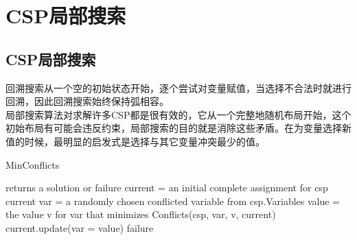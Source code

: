 \newpage

\section{CSP局部搜索}

\subsection{CSP局部搜索}

回溯搜索从一个空的初始状态开始，逐个尝试对变量赋值，当选择不合法时就进行回溯，因此回溯搜索始终保持弧相容。\\

局部搜索算法对求解许多CSP都是很有效的，它从一个完整地随机布局开始，这个初始布局有可能会违反约束，局部搜索的目的就是消除这些矛盾。在为变量选择新值的时候，最明显的启发式是选择与其它变量冲突最少的值。\\

\begin{algorithm}[H]
    \caption{MinConflicts}
    \begin{algorithmic}[1]
         returns a solution or failure
        \State current = an initial complete assignment for csp
        \State \Return current
        \EndIf
        \State var = a randomly chosen conflicted variable from csp.Variables
        \State value = the value v for var that minimizes Conflicts(csp, var, v, current)
        \State current.update({var = value})
        \EndFor
        \State \Return failure
        \EndProcedure
    \end{algorithmic}
\end{algorithm}

\newpage